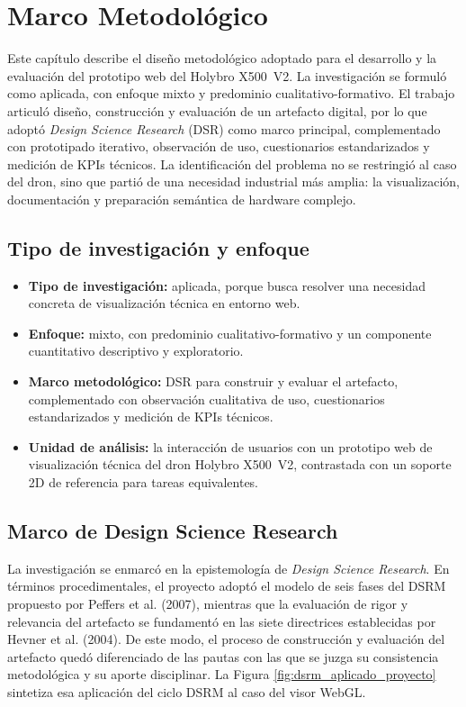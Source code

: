 \section{Marco Metodológico}

Este capítulo describe el diseño metodológico adoptado para el desarrollo y la evaluación del prototipo web del Holybro X500~V2. La investigación se formuló como aplicada, con enfoque mixto y predominio cualitativo-formativo. El trabajo articuló diseño, construcción y evaluación de un artefacto digital, por lo que adoptó \textit{Design Science Research} (DSR) como marco principal, complementado con prototipado iterativo, observación de uso, cuestionarios estandarizados y medición de KPIs técnicos. La identificación del problema no se restringió al caso del dron, sino que partió de una necesidad industrial más amplia: la visualización, documentación y preparación semántica de hardware complejo.

\subsection{Tipo de investigación y enfoque}

\begin{itemize}
    \item \textbf{Tipo de investigación:} aplicada, porque busca resolver una necesidad concreta de visualización técnica en entorno web.
    \item \textbf{Enfoque:} mixto, con predominio cualitativo-formativo y un componente cuantitativo descriptivo y exploratorio.
    \item \textbf{Marco metodológico:} DSR para construir y evaluar el artefacto, complementado con observación cualitativa de uso, cuestionarios estandarizados y medición de KPIs técnicos.
    \item \textbf{Unidad de análisis:} la interacción de usuarios con un prototipo web de visualización técnica del dron Holybro X500~V2, contrastada con un soporte 2D de referencia para tareas equivalentes.
\end{itemize}

\subsection{Marco de Design Science Research}

La investigación se enmarcó en la epistemología de \textit{Design Science Research}. En términos procedimentales, el proyecto adoptó el modelo de seis fases del DSRM propuesto por Peffers et al. (2007), mientras que la evaluación de rigor y relevancia del artefacto se fundamentó en las siete directrices establecidas por Hevner et al. (2004). De este modo, el proceso de construcción y evaluación del artefacto quedó diferenciado de las pautas con las que se juzga su consistencia metodológica y su aporte disciplinar. La Figura \ref{fig:dsrm_aplicado_proyecto} sintetiza esa aplicación del ciclo DSRM al caso del visor WebGL.


